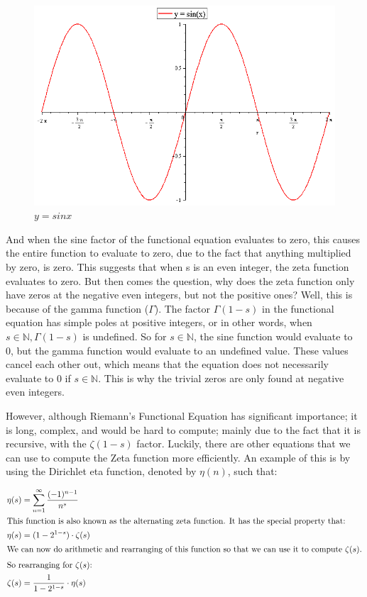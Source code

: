 \documentclass{article}
\begin{document}
\begin{figure}[h]
    \centering
    \includegraphics[scale=0.3]{sinx-graph}
    \caption{$y=sin x$}
\end{figure}

And when the sine factor of the functional equation evaluates to zero, this causes the entire function to evaluate to zero, due to the fact that anything multiplied by zero, is zero. This suggests that when s is an even integer, the zeta function evaluates to zero. But then comes the question, why does the zeta function only have zeros at the negative even integers, but not the positive ones? Well, this is because of the gamma function ($\Gamma$).  The factor $\Gamma(1-s)$ in the functional equation has simple poles at positive integers, or in other words, when $s \in \mathbb{N}, \Gamma(1-s)$ is undefined. So for $s \in \mathbb{N}$, the sine function would evaluate to 0, but the gamma function would evaluate to an undefined value. These values cancel each other out, which means that the equation does not necessarily evaluate to $0$ if  $s \in \mathbb{N}$. This is why the trivial zeros are only found at negative even integers.

However, although Riemann’s Functional Equation has significant importance; it is long, complex, and would be hard to compute; mainly due to the fact that it is recursive, with the $\zeta(1-s)$ factor. Luckily, there are other equations that we can use to compute the Zeta function more efficiently.
An example of this is by using the Dirichlet eta function, denoted by $\eta(n)$, such that:


\begin{align*}
    \eta(s) &= \sum_{n=1}^{\infty}\frac{(-1)^{n-1}}{n^s}\\
    \intertext{This function is also known as the alternating zeta function. It has the special property that:}
    \eta(s) &= (1-2^{1-s})\cdot\zeta(s)\\
    \intertext{We can now do arithmetic and rearranging of this function so that we can use it to compute $\zeta(s)$.}
    \intertext{So rearranging for $\zeta(s)$:}
    \zeta(s)&=\frac{1}{1-2^{1-s}}\cdot \eta(s)
\end{align*}
\end{document}
